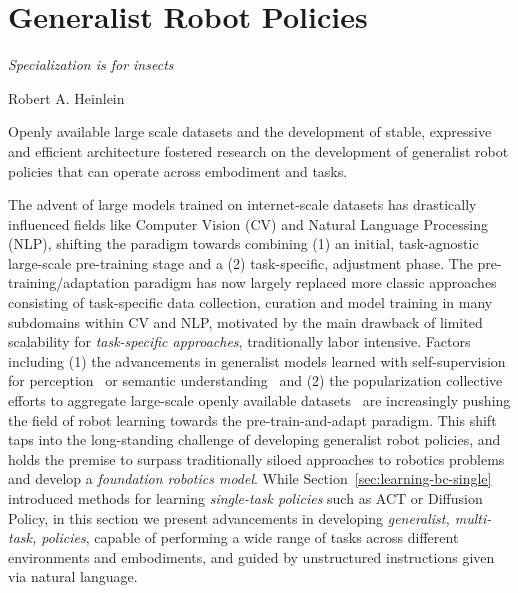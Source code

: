 \section{Generalist Robot Policies}
\label{sec:learning-foundation}

\epigraph{\textit{Specialization is for insects}}{Robert A. Heinlein}

\begin{tldr}
Openly available large scale datasets and the development of stable, expressive and efficient architecture fostered research on the development of generalist robot policies that can operate across embodiment and tasks.
\end{tldr}

The advent of large models trained on internet-scale datasets has drastically influenced fields like Computer Vision (CV) and Natural Language Processing (NLP), shifting the paradigm towards combining (1) an initial, task-agnostic large-scale pre-training stage and a (2) task-specific, adjustment phase.
The pre-training/adaptation paradigm has now largely replaced more classic approaches consisting of task-specific data collection, curation and model training in many subdomains within CV and NLP, motivated by the main drawback of limited scalability for \emph{task-specific approaches}, traditionally labor intensive.
Factors including (1) the advancements in generalist models learned with self-supervision for perception~\citep{oquabDINOv2LearningRobust2024} or semantic understanding~\citep{devlinBERTPretrainingDeep2019} and (2) the popularization collective efforts to aggregate large-scale openly available datasets~\citep{collaborationOpenXEmbodimentRobotic2025,khazatskyDROIDLargeScaleInTheWild2025} are increasingly pushing the field of robot learning towards the pre-train-and-adapt paradigm.
This shift taps into the long-standing challenge of developing generalist robot policies, and holds the premise to surpass traditionally siloed approaches to robotics problems and develop a \emph{foundation robotics model}.
While Section~\ref{sec:learning-bc-single} introduced methods for learning \emph{single-task policies} such as ACT or Diffusion Policy, in this section we present advancements in developing \emph{generalist, multi-task, policies}, capable of performing a wide range of tasks across different environments and embodiments, and guided by unstructured instructions given via natural language.

